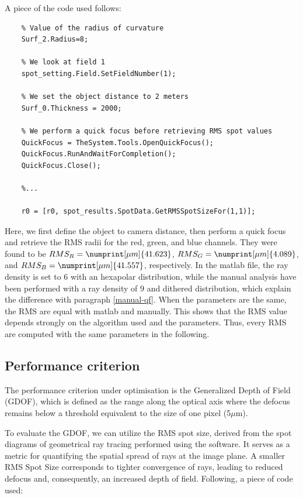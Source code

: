 \documentclass[10pt,letterpaper]{article}
\begin{document}
A piece of the code used follows:

\begin{verbatim}
    % Value of the radius of curvature
    Surf_2.Radius=8;

    % We look at field 1
    spot_setting.Field.SetFieldNumber(1);

    % We set the object distance to 2 meters
    Surf_0.Thickness = 2000;

    % We perform a quick focus before retrieving RMS spot values
    QuickFocus = TheSystem.Tools.OpenQuickFocus();
    QuickFocus.RunAndWaitForCompletion();
    QuickFocus.Close();

    %...

    r0 = [r0, spot_results.SpotData.GetRMSSpotSizeFor(1,1)];
\end{verbatim}

Here, we first define the object to camera distance, then perform a quick focus and retrieve the RMS radii for the red, green, and blue channels. They were found to be $RMS_R = \numprint[\mu m]{41.623}$, $RMS_G = \numprint[\mu m]{4.089}$, and $RMS_B = \numprint[\mu m]{41.557}$, respectively. In the matlab file, the ray density is set to 6 with an hexapolar distribution, while the manual analysis have been performed with a ray density of 9 and dithered distribution, which explain the difference with paragraph \ref{manual-qf}. When the parameters are the same, the RMS are equal with matlab and manually. This shows that the RMS value depends strongly on the algorithm used and the parameters. Thus, every RMS are computed with the same parameters in the following.

\subsection{Performance criterion}
The performance criterion under optimisation is the Generalized Depth of Field (GDOF), which is defined as the range along the optical axis where the defocus remains below a threshold equivalent to the size of one pixel (5$\mu$m).

To evaluate the GDOF, we can utilize the RMS spot size, derived from the spot diagrams of geometrical ray tracing performed using the software. It serves as a metric for quantifying the spatial spread of rays at the image plane. A smaller RMS Spot Size corresponds to tighter convergence of rays, leading to reduced defocus and, consequently, an increased depth of field.
Following, a piece of code used:
\end{document}
